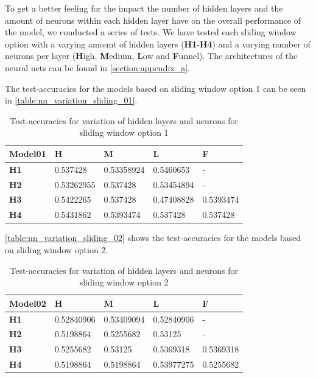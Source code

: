 To get a better feeling for the impact the number of hidden layers and the amount of neurons within each hidden layer have on the overall performance of the model, we conducted a series of tests.\newline
We have tested each sliding window option with a varying amount of hidden layers (\textbf{H1}-\textbf{H4}) and a varying number of neurons per layer (\textbf{H}igh, \textbf{M}edium, \textbf{L}ow and \textbf{F}unnel).\newline
The architectures of the neural nets can be found in \autoref{section:appendix_a}.\newline

The test-accuracies for the models based on sliding window option 1 can be seen in \autoref{table:nn_variation_sliding_01}.

\begin{table}
\centering
\begin{tabular}{|l|l|l|l|l|}
\hline

\textbf{Model01} & \textbf{H} & \textbf{M} & \textbf{L} & \textbf{F} \\ \hline
\textbf{H1} & 0.537428 & 0.53358924 & 0.5460653 & - \\ \hline
\textbf{H2} & 0.53262955 & 0.537428 & 0.53454894 & - \\ \hline
\textbf{H3} & 0.5422265 & 0.537428 & 0.47408828 & 0.5393474 \\ \hline
\textbf{H4} & 0.5431862 & 0.5393474 & 0.537428 & 0.537428 \\ \hline

\end{tabular}
\caption{Test-accuracies for variation of hidden layers and neurons for sliding window option 1}
\label{table:nn_variation_sliding_01}
\end{table}

\autoref{table:nn_variation_sliding_02} shows the test-accuracies for the models based on sliding window option 2.

\begin{table}
\centering
\begin{tabular}{|l|l|l|l|l|}
\hline

\textbf{Model02} & \textbf{H} & \textbf{M} & \textbf{L} & \textbf{F} \\ \hline
\textbf{H1} & 0.52840906 & 0.53409094 & 0.52840906 & - \\ \hline
\textbf{H2} & 0.5198864 & 0.5255682 & 0.53125 & - \\ \hline
\textbf{H3} & 0.5255682 & 0.53125 & 0.5369318 & 0.5369318 \\ \hline
\textbf{H4} & 0.5198864 & 0.5198864 & 0.53977275 & 0.5255682 \\ \hline

\end{tabular}
\caption{Test-accuracies for variation of hidden layers and neurons for sliding window option 2}
\label{table:nn_variation_sliding_02}
\end{table}

